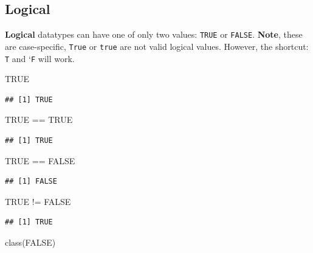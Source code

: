 \documentclass[a4paper]{book}
\newenvironment{Shaded}{}{}
\newcommand{\KeywordTok}[1]{\textcolor[rgb]{0.00,0.00,1.00}{{#1}}}
\newcommand{\StringTok}[1]{\textcolor[rgb]{0.00,0.50,0.50}{{#1}}}
\newcommand{\OtherTok}[1]{\textcolor[rgb]{1.00,0.25,0.00}{{#1}}}
\newcommand{\NormalTok}[1]{{#1}}
\newlength{\leftbarwidth}
\newlength{\leftbarsep}
\newcommand*{\leftbarcolorcmd}{\color{darkgray}}%
\renewenvironment{leftbar}{%
    \def\FrameCommand{{\leftbarcolorcmd{\vrule width \leftbarwidth\relax\hspace {\leftbarsep}}}}%
    \MakeFramed {\advance \hsize -\width \FrameRestore }%
}{%
    \endMakeFramed
}
\renewenvironment{Shaded}
{\vspace{0em}\begin{leftbar}\begin{snugshade}}
{\end{snugshade}\end{leftbar}\vspace{0pt}}
\begin{document}
\subsection{Logical}\label{logical}

\textbf{Logical} datatypes can have one of only two values:
\texttt{TRUE} or \texttt{FALSE}. \textbf{Note}, these are case-specific,
\texttt{True} or \texttt{true} are not valid logical values. However,
the shortcut: \texttt{T} and `\texttt{F} will work.

\begin{Shaded}
\begin{Highlighting}[]
\OtherTok{TRUE}
\end{Highlighting}
\end{Shaded}

\begin{verbatim}
## [1] TRUE
\end{verbatim}

\begin{Shaded}
\begin{Highlighting}[]
\OtherTok{TRUE} \NormalTok{==}\StringTok{ }\OtherTok{TRUE}
\end{Highlighting}
\end{Shaded}

\begin{verbatim}
## [1] TRUE
\end{verbatim}

\begin{Shaded}
\begin{Highlighting}[]
\OtherTok{TRUE} \NormalTok{==}\StringTok{ }\OtherTok{FALSE}
\end{Highlighting}
\end{Shaded}

\begin{verbatim}
## [1] FALSE
\end{verbatim}

\begin{Shaded}
\begin{Highlighting}[]
\OtherTok{TRUE} \NormalTok{!=}\StringTok{ }\OtherTok{FALSE}
\end{Highlighting}
\end{Shaded}

\begin{verbatim}
## [1] TRUE
\end{verbatim}

\begin{Shaded}
\begin{Highlighting}[]
\KeywordTok{class}\NormalTok{(}\OtherTok{FALSE}\NormalTok{)}
\end{Highlighting}
\end{Shaded}
\end{document}
